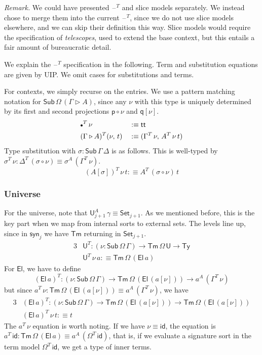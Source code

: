 \documentclass[12pt,a4paper,twoside,openany]{book}
\theoremstyle{remark}
\theoremstyle{definition}
\theoremstyle{theorem}
\newcommand{\id}{\mathsf{id}}
\newcommand{\Sub}{\mathsf{Sub}}
\newcommand{\Tm}{\mathsf{Tm}}
\newcommand{\Ty}{\mathsf{Ty}}
\newcommand{\U}{\mathsf{U}}
\newcommand{\El}{\mathsf{El}}
\renewcommand{\tt}{\mathsf{tt}}
\newcommand{\blank}{\mathord{\hspace{1pt}\text{--}\hspace{1pt}}}
\newcommand{\Set}{\mathsf{Set}}
\newcommand{\ext}{\triangleright}
\newcommand{\emptycon}{\scaleobj{.75}\bullet}
\newcommand{\p}{\mathsf{p}}
\newcommand{\q}{\mathsf{q}}
\newcommand{\syn}{\mathsf{syn}}
\newcommand{\defn}{:\equiv}
\begin{document}
\emph{Remark.} We could have presented $\blank^T$ and slice models separately.
We instead chose to merge them into the current $\blank^T$, since we do not use
slice models elsewhere, and we can skip their definition this way. Slice models
would require the specification of \emph{telescopes}, used to extend the base
context, but this entails a fair amount of bureaucratic detail.

We explain the $\blank^T$ specification in the following. Term and substitution
equations are given by UIP. We omit cases for substitutions and terms.

For contexts, we simply recurse on the entries. We use a pattern matching
notation for $\Sub\,\Omega\,(\Gamma\ext A)$, since any $\nu$ with this type is
uniquely determined by its first and second projections $\p\circ\nu$ and
$\q[\nu]$.
\begin{alignat*}{3}
  &\emptycon^T\,\nu           &&\defn \tt\\
  &(\Gamma \ext A)^T(\nu,\,t) &&\defn (\Gamma^T\,\nu,\,A^T\,\nu\,t)
\end{alignat*}
Type substitution with $\sigma : \Sub\,\Gamma\,\Delta$ is as follows. This is well-typed by
$\sigma^T\,\nu : \Delta^T\,(\sigma \circ \nu) \equiv \sigma^A\,(\Gamma^T\,\nu)$.
\[ (A[\sigma])^T\,\nu\,t \defn A^T\,(\sigma\circ\nu)\,t \]

\subsubsection{Universe}
For the universe, note that $\U^A_{j+1}\,\gamma \equiv \Set_{j+1}$.  As we
mentioned before, this is the key part when we map from internal sorts to
external sets. The levels line up, since in $\syn_j$ we have $\Tm$ returning in $\Set_{j+1}$.
\begin{alignat*}{3}
  &\U^T : (\nu : \Sub\,\Omega\,\Gamma) \to \Tm\,\Omega\,\U \to
          \Ty\\
  &\U^T\,\nu\,a \defn \Tm\,\Omega\,(\El\,a)
\end{alignat*}
For $\El$, we have to define
\[
  (\El\,a)^T : (\nu : \Sub\,\Omega\,\Gamma)
          \to \Tm\,\Omega\,(\El\,(a[\nu])) \to a^A\,(\Gamma^T\,\nu)
\]
but since $a^T\,\nu : \Tm\,\Omega\,(\El\,(a[\nu]))
      \equiv a^A\,(\Gamma^T\,\nu)$, we have
\begin{alignat*}{3}
  &(\El\,a)^T : (\nu : \Sub\,\Omega\,\Gamma)
          \to \Tm\,\Omega\,(\El\,(a[\nu])) \to \Tm\,\Omega\,(\El\,(a[\nu]))\\
  &(\El\,a)^T\,\nu\,t \defn t
\end{alignat*}
The $a^T\,\nu$ equation is worth noting. If we have $\nu \equiv \id$, the
equation is $a^T\,\id : \Tm\,\Omega\,(\El\,a) \equiv
a^A\,(\Omega^T\,\id)$, that is, if we evaluate a signature sort in the term
model $\Omega^T\,\id$, we get a type of inner terms.
\end{document}
